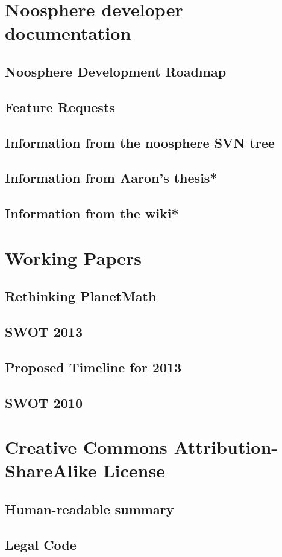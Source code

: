 \documentclass[12pt,report]{memoir}
\begin{document}
\chapter{Noosphere developer documentation}

\section{Noosphere Development Roadmap}


\section{Feature Requests}


\section{Information from the noosphere SVN tree}


\section{Information from Aaron's thesis*}
\section{Information from the wiki*}

\chapter{Working Papers}
\section{Rethinking PlanetMath}

\section{SWOT 2013}

\section{Proposed Timeline for 2013}

\section{SWOT 2010}


\chapter{Creative Commons Attribution-ShareAlike License}

\section{Human-readable summary}


\section{Legal Code}

\end{document}
